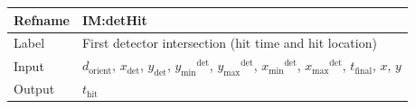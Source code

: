 \documentclass[12pt]{article}
\begin{document}
\medskip
\noindent
\begin{minipage}{\textwidth}
\begin{tabular}{>{\raggedright}p{}>{\raggedright\arraybackslash}p{}}
\toprule \textbf{Refname} & \textbf{IM:detHit}
\label{IM:detHit}
\\ \midrule
Label & First detector intersection (hit time and hit location)
        
\\ \midrule
Input & ${d_{\text{orient}}}$, ${x_{\text{det}}}$, ${y_{\text{det}}}$, ${{y_{\text{min}}}^{\text{det}}}$, ${{y_{\text{max}}}^{\text{det}}}$, ${{x_{\text{min}}}^{\text{det}}}$, ${{x_{\text{max}}}^{\text{det}}}$, ${t_{\text{final}}}$, $x$, $y$
        
\\ \midrule
Output & ${t_{\text{hit}}}$
         

\end{tabular}
\end{minipage}
\end{document}
